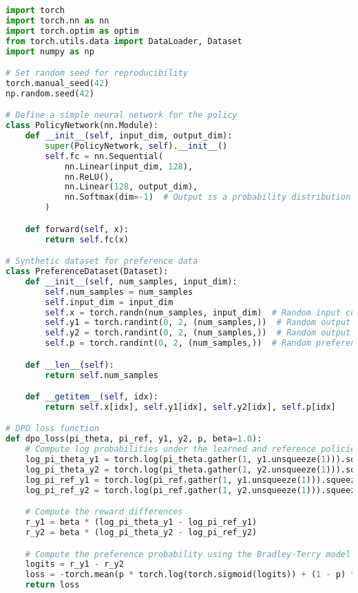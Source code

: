 \begin{lstlisting}[language=Python]
import torch
import torch.nn as nn
import torch.optim as optim
from torch.utils.data import DataLoader, Dataset
import numpy as np

# Set random seed for reproducibility
torch.manual_seed(42)
np.random.seed(42)

# Define a simple neural network for the policy
class PolicyNetwork(nn.Module):
    def __init__(self, input_dim, output_dim):
        super(PolicyNetwork, self).__init__()
        self.fc = nn.Sequential(
            nn.Linear(input_dim, 128),
            nn.ReLU(),
            nn.Linear(128, output_dim),
            nn.Softmax(dim=-1)  # Output is a probability distribution
        )

    def forward(self, x):
        return self.fc(x)

# Synthetic dataset for preference data
class PreferenceDataset(Dataset):
    def __init__(self, num_samples, input_dim):
        self.num_samples = num_samples
        self.input_dim = input_dim
        self.x = torch.randn(num_samples, input_dim)  # Random input contexts
        self.y1 = torch.randint(0, 2, (num_samples,))  # Random output 1
        self.y2 = torch.randint(0, 2, (num_samples,))  # Random output 2
        self.p = torch.randint(0, 2, (num_samples,))  # Random preferences (0 or 1)

    def __len__(self):
        return self.num_samples

    def __getitem__(self, idx):
        return self.x[idx], self.y1[idx], self.y2[idx], self.p[idx]

# DPO loss function
def dpo_loss(pi_theta, pi_ref, y1, y2, p, beta=1.0):
    # Compute log probabilities under the learned and reference policies
    log_pi_theta_y1 = torch.log(pi_theta.gather(1, y1.unsqueeze(1))).squeeze()
    log_pi_theta_y2 = torch.log(pi_theta.gather(1, y2.unsqueeze(1))).squeeze()
    log_pi_ref_y1 = torch.log(pi_ref.gather(1, y1.unsqueeze(1))).squeeze()
    log_pi_ref_y2 = torch.log(pi_ref.gather(1, y2.unsqueeze(1))).squeeze()

    # Compute the reward differences
    r_y1 = beta * (log_pi_theta_y1 - log_pi_ref_y1)
    r_y2 = beta * (log_pi_theta_y2 - log_pi_ref_y2)

    # Compute the preference probability using the Bradley-Terry model
    logits = r_y1 - r_y2
    loss = -torch.mean(p * torch.log(torch.sigmoid(logits)) + (1 - p) * torch.log(torch.sigmoid(-logits)))
    return loss


\end{lstlisting}
